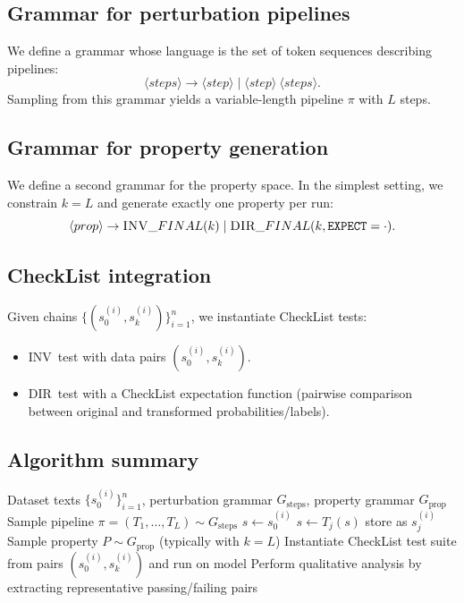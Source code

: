 \documentclass[11pt]{article}
\newcommand{\INV}{\textsc{INV}}
\newcommand{\DIR}{\textsc{DIR}}
\begin{document}
\subsection{Grammar for perturbation pipelines}
We define a grammar whose language is the set of token sequences describing pipelines:
\[
\langle steps \rangle \rightarrow \langle step \rangle \mid \langle step \rangle \ \langle steps \rangle.
\]
Sampling from this grammar yields a variable-length pipeline $\pi$ with $L$ steps.

\subsection{Grammar for property generation}
We define a second grammar for the property space. In the simplest setting, we constrain $k=L$ and generate exactly one property per run:
\[
\langle prop \rangle \rightarrow \INV\_FINAL(k) \mid \DIR\_FINAL(k,\texttt{EXPECT}=\cdot).
\]

\subsection{CheckList integration}
Given chains $\{(s_0^{(i)}, s_k^{(i)})\}_{i=1}^n$, we instantiate CheckList tests:
\begin{itemize}
  \item \INV\ test with data pairs $(s_0^{(i)}, s_k^{(i)})$.
  \item \DIR\ test with a CheckList expectation function (pairwise comparison between original and transformed probabilities/labels).
\end{itemize}

\subsection{Algorithm summary}
\begin{algorithm}[H]
\caption{Grammar-based Multi-step Metamorphic Testing}
\begin{algorithmic}[1]
\Require Dataset texts $\{s_0^{(i)}\}_{i=1}^n$, perturbation grammar $G_{\text{steps}}$, property grammar $G_{\text{prop}}$
\State Sample pipeline $\pi=(T_1,\dots,T_L) \sim G_{\text{steps}}$
  \State $s \gets s_0^{(i)}$
    \State $s \gets T_j(s)$
    \State store as $s_j^{(i)}$
  \EndFor
\EndFor
\State Sample property $P \sim G_{\text{prop}}$ (typically with $k=L$)
\State Instantiate CheckList test suite from pairs $(s_0^{(i)}, s_k^{(i)})$ and run on model
\State Perform qualitative analysis by extracting representative passing/failing pairs
\end{algorithmic}
\end{algorithm}
\end{document}
